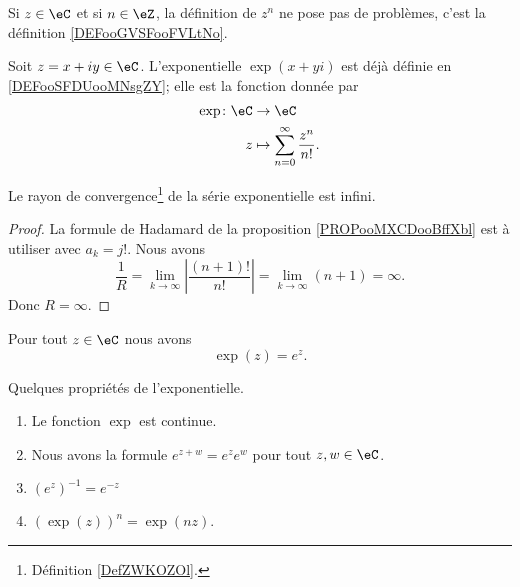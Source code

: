 Si \( z\in \eC\) et si \( n\in \eZ\), la définition de \( z^n\) ne pose pas de problèmes, c'est la définition \ref{DEFooGVSFooFVLtNo}.

\begin{normaltext}  \label{DefJilXoM}
    Soit \( z=x+iy\in \eC\). L'exponentielle \( \exp(x+yi)\) est déjà définie en \ref{DEFooSFDUooMNsgZY}; elle est la fonction donnée par
    \begin{equation}
        \begin{aligned}
            \exp\colon \eC&\to \eC \\
            z&\mapsto \sum_{n=0}^{\infty}\frac{ z^n }{ n! }.
        \end{aligned}
    \end{equation}
\end{normaltext}

\begin{proposition}     \label{PROPooXEYFooIEaPvU}
Le rayon de convergence\footnote{Définition \ref{DefZWKOZOl}.} de la série exponentielle est infini.
\end{proposition}

\begin{proof}
    La formule de Hadamard de la proposition \ref{PROPooMXCDooBffXbl} est à utiliser avec \( a_k=j!\). Nous avons
    \begin{equation}
        \frac{1}{ R }=\lim_{k\to \infty} \left| \frac{ (n+1)! }{ n! } \right| =\lim_{k\to \infty} (n+1)=\infty.
    \end{equation}
    Donc \( R=\infty\).
\end{proof}

\begin{proposition}
    Pour tout \( z\in \eC\) nous avons
    \begin{equation}
        \exp(z)= e^{z}.
    \end{equation}
\end{proposition}

\begin{proposition}     \label{PropdDjisy}
    Quelques propriétés de l'exponentielle.
    \begin{enumerate}
        \item
            Le fonction \( \exp\) est continue.
        \item       \label{ITEMooRLHCooJTuYKV}
            Nous avons la formule \(  e^{z+w}= e^{z}e^w\) pour tout \( z,w\in \eC\).
        \item
            \( (e^z)^{-1}= e^{-z}\)
        \item
            \( (\exp(z))^n=\exp(nz)\).
    \end{enumerate}
\end{proposition}

